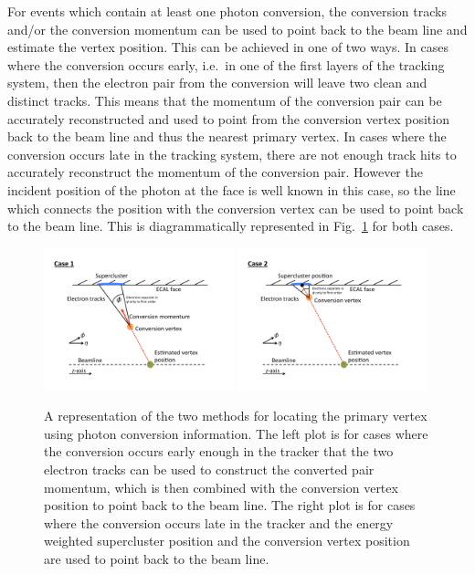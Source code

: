 For events which contain at least one photon conversion, the conversion tracks and/or the conversion momentum can be used to point back to the beam line and estimate the vertex position. This can be achieved in one of two ways. In cases where the conversion occurs early, i.e.\ in one of the first layers of the tracking system, then the electron pair from the conversion will leave two clean and distinct tracks. This means that the momentum of the conversion pair can be accurately reconstructed and used to point from the conversion vertex position back to the beam line and thus the nearest primary vertex. In cases where the conversion occurs late in the tracking system, there are not enough track hits to accurately reconstruct the momentum of the conversion pair. However the incident position of the photon at the \ECAL face is well known in this case, so the line which connects the \ECAL position with the conversion vertex can be used to point back to the beam line. This is diagrammatically represented in Fig.~\ref{fig:conv_diags} for both cases.

\begin{figure}
  \includegraphics[width=0.49\textwidth]{analysis_comps/plots/ConvDiagNewCase1.pdf}
  \includegraphics[width=0.49\textwidth]{analysis_comps/plots/ConvDiagNewCase2.pdf}
  \caption[A schematic showing the two methods used for locating the primary vertex]{A representation of the two methods for locating the primary vertex using photon conversion information. The left plot is for cases where the conversion occurs early enough in the tracker that the two electron tracks can be used to construct the converted pair momentum, which is then combined with the conversion vertex position to point back to the beam line. The right plot is for cases where the conversion occurs late in the tracker and the energy weighted supercluster position and the conversion vertex position are used to point back to the beam line.}
  \label{fig:conv_diags}
\end{figure}

